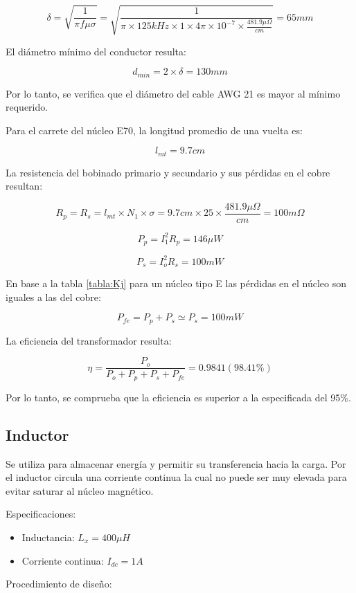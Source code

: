 $$ \delta=\sqrt{\frac{1}{\pi f\mu\sigma}}=\sqrt{\frac{1}{\pi\times125kHz\times1\times4\pi\times10^{-7}\times\frac{481.9\mu\Omega}{cm}}}=65mm $$

El diámetro mínimo del conductor resulta:

$$ d_{min}=2\times\delta=130mm$$

Por lo tanto, se verifica que el diámetro del cable AWG 21 es mayor al mínimo requerido. 

Para el carrete del núcleo E70, la longitud promedio de una vuelta es: 

$$ l_{mt}=9.7cm $$

La resistencia del bobinado primario y secundario y sus pérdidas en el cobre resultan:

$$ R_p=R_s=l_{mt}\times N_{1}\times\sigma=9.7cm \times25 \times\frac{481.9\mu\Omega}{cm}=100m\Omega $$

$$ P_p=I_1^2R_p=146\mu W $$

$$ P_s=I_o^2R_s=100mW $$

En base a la tabla \ref{tabla:Kj} para un núcleo tipo E las pérdidas en el núcleo son iguales a las del cobre:

$$ P_{fe}=P_p+P_s \simeq P_s=100mW $$

La eficiencia del transformador resulta:

$$ \eta=\frac{P_o}{P_o+P_p+P_s+P_{fe}}=0.9841 (98.41\%) $$

Por lo tanto, se comprueba que la eficiencia es superior a la especificada del 95\%.  

\subsection{Inductor}

Se utiliza para almacenar energía y permitir su transferencia hacia la carga. 
Por el inductor circula una corriente continua la cual no puede ser muy elevada para evitar saturar al núcleo magnético. 

Especificaciones: 

\begin{itemize}
    \item Inductancia: $L_x=400\mu H$
    \item Corriente continua: $I_{dc}=1A$
\end{itemize}

Procedimiento de diseño:

